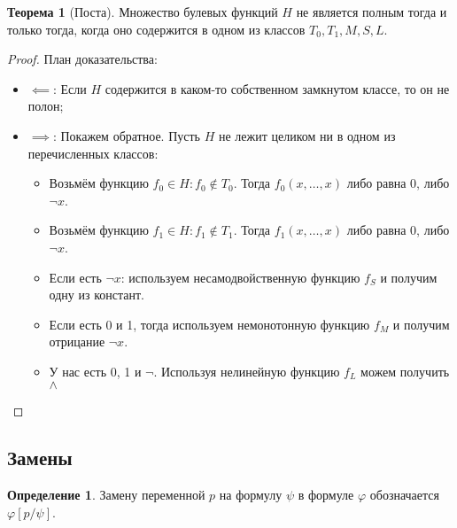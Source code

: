 \documentclass[12pt]{article}
\let\la\land
\let\n\neg
\let\nin\notin
\theoremstyle{definition}
\newtheorem{definition}{Определение}[section]
\newtheorem{theorem}{Теорема}[section]
\theoremstyle{statement}
\theoremstyle{theorem}
\begin{document}
\begin{theorem}[Поста]
  Множество булевых функций $H$ не является полным тогда и только
  тогда, когда оно содержится в одном из классов $T_0, T_1, M, S, L$.
  \begin{proof}
    План доказательства:
    \begin{itemize}
      \item $\impliedby$: Если $H$ содержится в каком-то собственном
        замкнутом классе, то он не полон;

      \item $\implies$: Покажем обратное. Пусть $H$ не лежит целиком
        ни в одном из перечисленных классов:
        \begin{itemize}
          \item Возьмём функцию $f_0 \in H \colon f_0 \nin T_0$.
            Тогда $f_0(x, \dots, x)$ либо равна 0, либо $\n x$.

          \item Возьмём функцию $f_1 \in H \colon f_1 \nin T_1$.
            Тогда $f_1(x, \dots, x)$ либо равна 0, либо $\n x$.

          \item Если есть $\n x$: используем несамодвойственную
            функцию $f_S$ и получим одну из констант.

          \item Если есть 0 и 1, тогда используем немонотонную
            функцию $f_M$ и получим отрицание $\n x$.

          \item У нас есть 0, 1 и $\n$. Используя нелинейную функцию
            $f_L$ можем получить $\la$
        \end{itemize}
    \end{itemize}
  \end{proof}
\end{theorem}

\subsection{Замены}

\begin{definition}
  Замену переменной $p$ на формулу $\psi$ в формуле $\varphi$
  обозначается $\varphi[p/\psi]$.
\end{definition}
\end{document}
